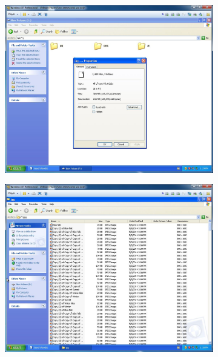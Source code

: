 \documentclass[
	a4paper,
	oneside,
	DIV = 12,
	fontsize = 13pt,
	headings = normal,
]{scrartcl}
\begin{document}
		\begin{figure}
			\centering
			\begin{subfigure}{0.5\columnwidth}
				\centering
				\includegraphics[height = 9.5\baselineskip]{./assets/y03s01-pcdiag-lab-03-p01.jpg}
				\caption{}
				\label{subfig:01-01-created-files}
			\end{subfigure}%
			\begin{subfigure}{0.5\columnwidth}
				\centering
				\includegraphics[height = 9.5\baselineskip]{./assets/y03s01-pcdiag-lab-03-p02.jpg}
				\caption{}
				\label{subfig:01-02-jpg}
			\end{subfigure}

\end{figure}
\end{document}
